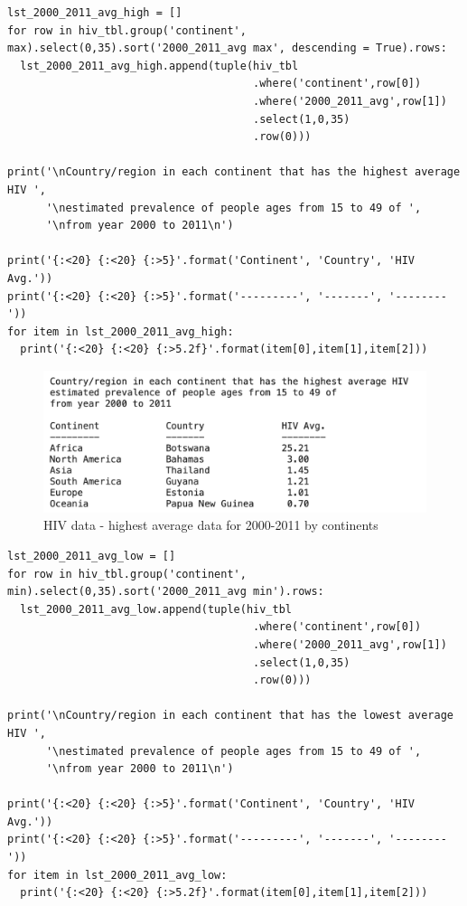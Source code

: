 \documentclass[UTF8, letter]{article}
\begin{document}
\pagebreak
\begin{codeblock}
\begin{verbatim}
lst_2000_2011_avg_high = []
for row in hiv_tbl.group('continent', max).select(0,35).sort('2000_2011_avg max', descending = True).rows:
  lst_2000_2011_avg_high.append(tuple(hiv_tbl
                                      .where('continent',row[0])
                                      .where('2000_2011_avg',row[1])
                                      .select(1,0,35)
                                      .row(0)))

print('\nCountry/region in each continent that has the highest average HIV ', 
      '\nestimated prevalence of people ages from 15 to 49 of ',
      '\nfrom year 2000 to 2011\n')

print('{:<20} {:<20} {:>5}'.format('Continent', 'Country', 'HIV Avg.'))
print('{:<20} {:<20} {:>5}'.format('---------', '-------', '--------'))
for item in lst_2000_2011_avg_high:
  print('{:<20} {:<20} {:>5.2f}'.format(item[0],item[1],item[2]))
\end{verbatim}
\end{codeblock}

\begin{figure}[h!]
	\centering
	\includegraphics[width=\linewidth]{output_6.png}
	\caption{HIV data - highest average data for 2000-2011 by continents}
	\label{fig:boat1}
\end{figure}

\pagebreak
\begin{codeblock}
\begin{verbatim}
lst_2000_2011_avg_low = []
for row in hiv_tbl.group('continent', min).select(0,35).sort('2000_2011_avg min').rows:
  lst_2000_2011_avg_low.append(tuple(hiv_tbl
                                      .where('continent',row[0])
                                      .where('2000_2011_avg',row[1])
                                      .select(1,0,35)
                                      .row(0)))

print('\nCountry/region in each continent that has the lowest average HIV ', 
      '\nestimated prevalence of people ages from 15 to 49 of ',
      '\nfrom year 2000 to 2011\n')

print('{:<20} {:<20} {:>5}'.format('Continent', 'Country', 'HIV Avg.'))
print('{:<20} {:<20} {:>5}'.format('---------', '-------', '--------'))
for item in lst_2000_2011_avg_low:
  print('{:<20} {:<20} {:>5.2f}'.format(item[0],item[1],item[2]))\end{verbatim}
\end{codeblock}
\end{document}

